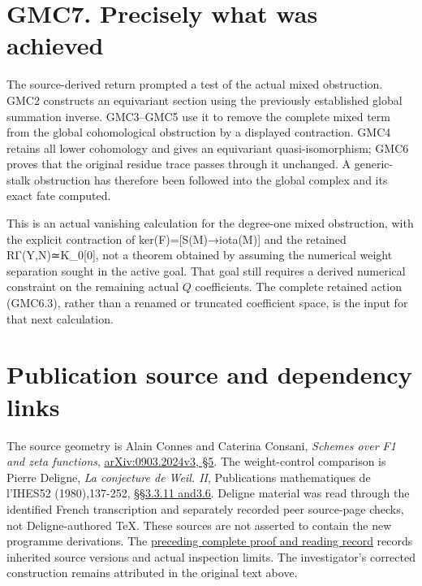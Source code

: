 \section{GMC7. Precisely what was
achieved}\label{gmc7.-precisely-what-was-achieved}

The source-derived return prompted a test of the actual mixed
obstruction. GMC2 constructs an equivariant section using the previously
established global summation inverse. GMC3--GMC5 use it to remove the
complete mixed term from the global cohomological obstruction by a
displayed contraction. GMC4 retains all lower cohomology and gives an
equivariant quasi-isomorphism; GMC6 proves that the original residue
trace passes through it unchanged. A generic-stalk obstruction has
therefore been followed into the global complex and its exact fate
computed.

This is an actual vanishing calculation for the degree-one mixed
obstruction, with the explicit contraction of ker(F)={[}S(M)→iota(M){]}
and the retained RΓ(Y,N)≃K\_0{[}0{]}, not a theorem obtained by assuming
the numerical weight separation sought in the active goal. That goal
still requires a derived numerical constraint on the remaining actual
\(Q\) coefficients. The complete retained action (GMC6.3), rather than a
renamed or truncated coefficient space, is the input for that next
calculation.

\section{Publication source and dependency
links}\label{publication-source-and-dependency-links-6}

The source geometry is Alain Connes and Caterina Consani, \emph{Schemes
over F1 and zeta functions},
\href{https://arxiv.org/abs/0903.2024v3}{arXiv:0903.2024v3, §5}. The
weight-control comparison is Pierre Deligne, \emph{La conjecture de
Weil. II}, Publications mathematiques de l'IHES52 (1980),137-252,
\href{https://www.numdam.org/item/PMIHES_1980__52__137_0/}{§§3.3.11
and3.6}. Deligne material was read through the identified French
transcription and separately recorded peer source-page checks, not
Deligne-authored TeX. These sources are not asserted to contain the new
programme derivations. The
\href{https://github.com/KokunoYumeto/zeta-function-research-reader/blob/36a82ecca98addb8a98b48204e349737856c7223/workbenches/splitzero-tandem/continuations/20260924-cohomology-weight-and-character-lifts/BUILD_AND_REVIEW.md}{preceding
complete proof and reading record} records inherited source versions and
actual inspection limits. The investigator's corrected construction
remains attributed in the original text above.

